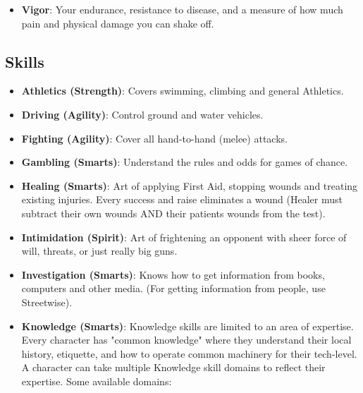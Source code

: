 \documentclass[10pt,twoside]{article}
\begin{document}
\begin{multicols}{2}
\begin{itemize}
            \item \textbf{Vigor}: Your endurance, resistance to disease, and a measure of how much pain and physical damage you can shake off.

        \end{itemize}


        \subsection{Skills}

        \begin{itemize}

            \item \textbf{Athletics (Strength)}: Covers swimming, climbing and general Athletics.

            \item \textbf{Driving (Agility)}: Control ground and water vehicles.

            \item \textbf{Fighting (Agility)}: Cover all hand-to-hand (melee) attacks.

            \item \textbf{Gambling (Smarts)}: Understand the rules and odds for games of chance.

            \item \textbf{Healing (Smarts)}: Art of applying First Aid, stopping wounds and treating existing injuries. Every success and raise eliminates a wound (Healer must subtract their own wounds AND their patients wounds from the test).

            \item \textbf{Intimidation (Spirit)}: Art of frightening an opponent with sheer force of will, threats, or just really big guns.

            \item \textbf{Investigation (Smarts)}: Knows how to get information from books, computers and other media. (For getting information from people, use Streetwise).

            \item \textbf{Knowledge (Smarts)}: Knowledge skills are limited to an area of expertise. Every character has "common knowledge" where they understand their local history, etiquette, and how to operate common machinery for their tech-level. A character can take multiple Knowledge skill domains to reflect their expertise. Some available domains:
            \begin{itemize}


\end{itemize}
\end{itemize}
\end{multicols}
\end{document}
